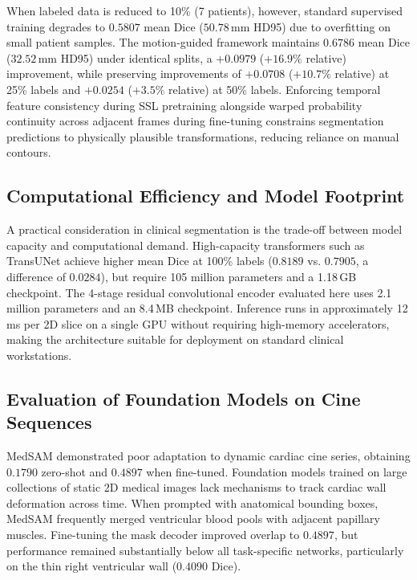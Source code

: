 \documentclass[pdflatex,sn-mathphys]{sn-jnl}
\theoremstyle{thmstyleone}
\theoremstyle{thmstyletwo}
\theoremstyle{thmstylethree}
\begin{document}
When labeled data is reduced to 10\% (7 patients), however, standard supervised training degrades to $0.5807$ mean Dice ($50.78$\,mm HD95) due to overfitting on small patient samples. The motion-guided framework maintains $0.6786$ mean Dice ($32.52$\,mm HD95) under identical splits, a $+0.0979$ ($+16.9\%$ relative) improvement, while preserving improvements of $+0.0708$ ($+10.7\%$ relative) at 25\% labels and $+0.0254$ ($+3.5\%$ relative) at 50\% labels. Enforcing temporal feature consistency during SSL pretraining alongside warped probability continuity across adjacent frames during fine-tuning constrains segmentation predictions to physically plausible transformations, reducing reliance on manual contours.

\subsection{Computational Efficiency and Model Footprint}
A practical consideration in clinical segmentation is the trade-off between model capacity and computational demand. High-capacity transformers such as TransUNet achieve higher mean Dice at 100\% labels ($0.8189$ vs. $0.7905$, a difference of $0.0284$), but require 105 million parameters and a 1.18\,GB checkpoint. The 4-stage residual convolutional encoder evaluated here uses 2.1 million parameters and an 8.4\,MB checkpoint. Inference runs in approximately 12\,ms per 2D slice on a single GPU without requiring high-memory accelerators, making the architecture suitable for deployment on standard clinical workstations.

\subsection{Evaluation of Foundation Models on Cine Sequences}
MedSAM demonstrated poor adaptation to dynamic cardiac cine series, obtaining $0.1790$ zero-shot and $0.4897$ when fine-tuned. Foundation models trained on large collections of static 2D medical images lack mechanisms to track cardiac wall deformation across time. When prompted with anatomical bounding boxes, MedSAM frequently merged ventricular blood pools with adjacent papillary muscles. Fine-tuning the mask decoder improved overlap to $0.4897$, but performance remained substantially below all task-specific networks, particularly on the thin right ventricular wall ($0.4090$ Dice).
\end{document}
